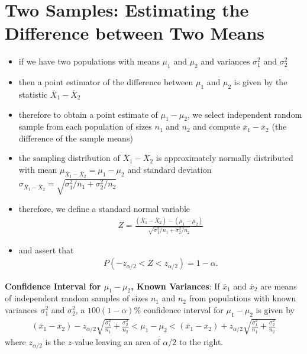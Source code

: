\documentclass[10pt]{article}
\begin{document}
\section{Two Samples: Estimating the Difference between Two Means}
\begin{itemize}
    \item if we have two populations with means $\mu_1$ and $\mu_2$ and variances $\sigma^2_1$ and $\sigma_2^2$ 
    \item then a point estimator of the difference between $\mu_1$ and $\mu_2$ is given by the statistic $\overline{X}_1 - \overline{X}_2$ 
    \item therefore to obtain a point estimate of $\mu_1 - \mu_2$, we select independent random sample from each population of sizes $ n_1$ and $n_2$ and compute $\overline{x}_1 - \overline{x}_2$ (the difference of the sample means)
    \item the sampling distribution of $\overline{X}_1 - \overline{X}_2$ is approximately normally distributed with mean $\mu_{\overline{X}_1-\overline{X}_2} = \mu_1 - \mu_2$ and standard deviation $\sigma_{\overline{X}_1-\overline{X}_2}=\sqrt{\sigma_1^2 / n_1 + \sigma_2^2 / n_2}$
    \item therefore, we define a standard normal variable 
        \begin{gather*}
            Z = \frac{(\overline{X}_1-\overline{X}_2)-(\mu_1-\mu_2)}{\sqrt{\sigma_1^2 / n_1 + \sigma_2^2 / n_2}}
        \end{gather*}
    \item and assert that 
        \begin{gather*}
            P(-z_{\alpha / 2} < Z < z_{\alpha / 2}) = 1 - \alpha
        .\end{gather*}
\end{itemize}
\begin{theorem}
    \textbf{Confidence Interval for $\mu_1-\mu_2$, Known Variances}: If $\overline{x}_1$ and $\overline{x}_2$ are means of independent random samples of sizes $n_1$ and $n_2$ from populations with known variances $\sigma_1^2$ and $\sigma_2^2$, a $100(1-\alpha)\%$ confidence interval for $\mu_1 - \mu_2$ is given by
    \begin{gather*}
        (\overline{x}_1-\overline{x}_2) - z_{\alpha / 2} \sqrt{\frac{\sigma_1^2}{n_1} + \frac{\sigma_2^2}{n_2}} < \mu_1 - \mu_2 < (\overline{x}_1-\overline{x}_2) + z_{\alpha / 2} \sqrt{\frac{\sigma_1^2}{n_1} + \frac{\sigma_2^2}{n_2}}
    \end{gather*}
    where $z_{\alpha / 2}$ is the $z$-value leaving an area of $\alpha / 2$ to the right.
\end{theorem}
\end{document}
